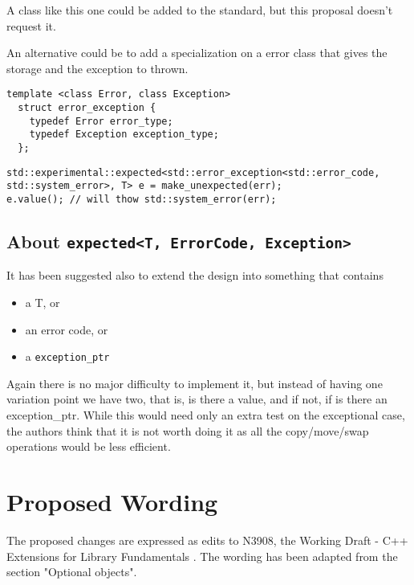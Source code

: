 \documentclass[a4paper,10pt]{article}
\newcommand{\cpp}[1]{\lstinline{#1}}
\begin{document}
A class like this one could be added to the standard, but this proposal doesn't request it. 

An alternative could be to add a specialization on a error class that gives the storage and the exception to thrown.

\begin{lstlisting}
template <class Error, class Exception>
  struct error_exception {
    typedef Error error_type;
    typedef Exception exception_type;
  };
\end{lstlisting}

\begin{lstlisting}
std::experimental::expected<std::error_exception<std::error_code, std::system_error>, T> e = make_unexpected(err);
e.value(); // will thow std::system_error(err);
\end{lstlisting}


\subsection{About \cpp{expected<T, ErrorCode, Exception>}}

It has been suggested also to extend the design into something that contains 

\begin{itemize}
\item a T, or
\item an error code, or
\item a \cpp{exception_ptr} 
\end{itemize}

Again there is no major difficulty to implement it, but instead of having one variation point we have two, that is, is there a value, and if not, if is there an exception_ptr. While this would need only an extra test on the exceptional case, the authors think that it is not worth doing it as all the copy/move/swap operations would be less efficient. 

\section{Proposed Wording}


The proposed changes are expressed as edits to N3908, the Working Draft - C++ Extensions for Library Fundamentals \cite{FundamentalsV1}. The wording has been adapted from the section  "Optional objects".
\newline
\end{document}

